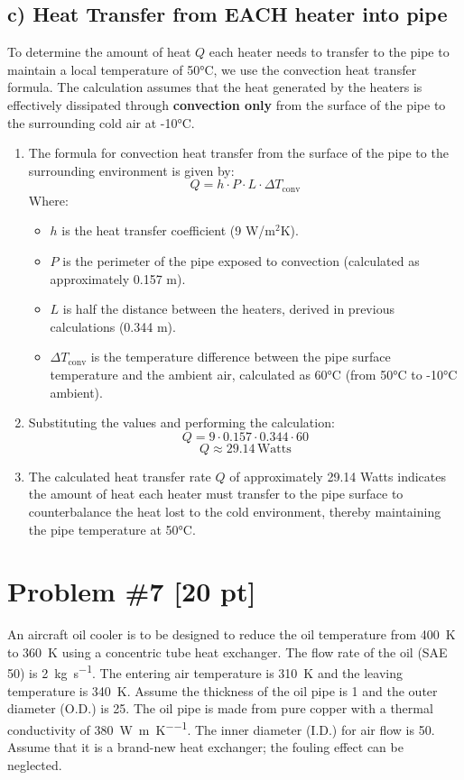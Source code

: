 \documentclass{article}
\begin{document}
\subsection*{c) Heat Transfer from EACH heater into pipe}
To determine the amount of heat \(Q\) each heater needs to transfer to the pipe to maintain a local temperature of 50°C, we use the convection heat transfer formula. The calculation assumes that the heat generated by the heaters is effectively dissipated through \textbf{convection only} from the surface of the pipe to the surrounding cold air at -10°C.

\begin{enumerate}
    \item The formula for convection heat transfer from the surface of the pipe to the surrounding environment is given by:
    \[
    Q = h \cdot P \cdot L \cdot \Delta T_{\text{conv}}
    \]
    Where:
    \begin{itemize}
        \item \(h\) is the heat transfer coefficient (9 W/m\(^2\)K).
        \item \(P\) is the perimeter of the pipe exposed to convection (calculated as approximately 0.157 m).
        \item \(L\) is half the distance between the heaters, derived in previous calculations (0.344 m).
        \item \(\Delta T_{\text{conv}}\) is the temperature difference between the pipe surface temperature and the ambient air, calculated as 60°C (from 50°C to -10°C ambient).
    \end{itemize}

    \item Substituting the values and performing the calculation:
    \[
    Q = 9 \cdot 0.157 \cdot 0.344 \cdot 60
    \]
    \[
    Q \approx 29.14 \, \text{Watts}
    \]

    \item The calculated heat transfer rate \(Q\) of approximately 29.14 Watts indicates the amount of heat each heater must transfer to the pipe surface to counterbalance the heat lost to the cold environment, thereby maintaining the pipe temperature at 50°C.
\end{enumerate}

\newpage
\section{Problem \#7 [20 pt]}
An aircraft oil cooler is to be designed to reduce the oil temperature from \SI{400}{\kelvin} to \SI{360}{\kelvin} using a concentric tube heat exchanger. The flow rate of the oil (SAE 50) is \SI{2}{\kilogram\per\second}. The entering air temperature is \SI{310}{\kelvin} and the leaving temperature is \SI{340}{\kelvin}. Assume the thickness of the oil pipe is \SI{1}{\millimeter} and the outer diameter (O.D.) is \SI{25}{\millimeter}. The oil pipe is made from pure copper with a thermal conductivity of \SI{380}{\watt\per\meter\per\kelvin}. The inner diameter (I.D.) for air flow is \SI{50}{\millimeter}. Assume that it is a brand-new heat exchanger; the fouling effect can be neglected.
\end{document}
